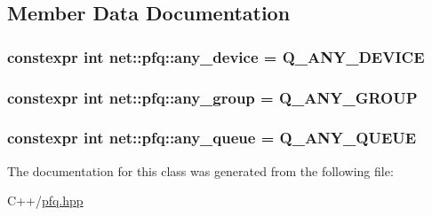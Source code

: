 \subsection{Member Data Documentation}
\hypertarget{classnet_1_1pfq_a8ecbb4cb4e632b85865a6c77fd4a6a45}{
\subsubsection[{any\-\_\-device}]{\setlength{\rightskip}{0pt plus 5cm}constexpr int net\-::pfq\-::any\-\_\-device = Q\-\_\-\-A\-N\-Y\-\_\-\-D\-E\-V\-I\-C\-E\hspace{0.3cm}{\ttfamily [static]}}}\label{classnet_1_1pfq_a8ecbb4cb4e632b85865a6c77fd4a6a45}
\hypertarget{classnet_1_1pfq_a3aa94e5b77640a4db592893fa9220e81}{
\subsubsection[{any\-\_\-group}]{\setlength{\rightskip}{0pt plus 5cm}constexpr int net\-::pfq\-::any\-\_\-group = Q\-\_\-\-A\-N\-Y\-\_\-\-G\-R\-O\-U\-P\hspace{0.3cm}{\ttfamily [static]}}}\label{classnet_1_1pfq_a3aa94e5b77640a4db592893fa9220e81}
\hypertarget{classnet_1_1pfq_a0d4eca6d0925b7c49365675c9cf9385c}{
\subsubsection[{any\-\_\-queue}]{\setlength{\rightskip}{0pt plus 5cm}constexpr int net\-::pfq\-::any\-\_\-queue = Q\-\_\-\-A\-N\-Y\-\_\-\-Q\-U\-E\-U\-E\hspace{0.3cm}{\ttfamily [static]}}}\label{classnet_1_1pfq_a0d4eca6d0925b7c49365675c9cf9385c}


The documentation for this class was generated from the following file\-:\begin{DoxyCompactItemize}
\item 
C++/\hyperlink{pfq_8hpp}{pfq.\-hpp}\end{DoxyCompactItemize}
